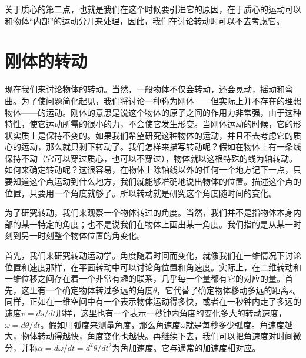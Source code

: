 关于质心的第二点，也就是我们在这个时候要引进它的原因，在于质心的运动可以和物体“内部”的运动分开来处理，因此，我们在讨论转动时可以不去考虑它。

\section{刚体的转动}

现在我们来讨论物体的转动。当然，一般物体不仅会转动，还会晃动，摇动和弯曲。为了使问题简化起见，我们将讨论一种称为刚体——但实际上并不存在的理想物体——的运动。刚体的意思是说这个物体的原子之间的作用力非常强，由于这种特性，使它运动所需的很小的力，不会使它发生形变。当刚体运动的时候，它的形状实质上是保持不变的。如果我们希望研究这种物体的运动，并且不去考虑它的质心的运动，那么就只剩下转动了。我们怎样来描写转动呢？假如在物体上有一条线保持不动（它可以穿过质心，也可以不穿过），物体就以这根特殊的线为轴转动。如何来确定转动呢？这很容易，在物体上除轴线以外的任何一个地方记下一点，只要知道这个点运动到什么地方，我们就能够准确地说出物体的位置。描述这个点的位置，只要用一个角度就够了。所以转动就是研究这个角度随时间的变化。

为了研究转动，我们来观察一个物体转过的角度。当然，我们并不是指物体本身内部的某一特定的角度；也不是说我们在物体上画出某一角度。我们指的是从某一时刻到另一时刻整个物体位置的角变化。

首先，我们来研究转动运动学。角度随着时间而变化，就像我们在一维情况下讨论位置和速度那样，在平面转动中可以讨论角位置和角速度。实际上，在二维转动和一维位移之间存在着一个非常有趣的联系，几乎每一个量都有它的对应的量。首先，这里有一个确定物体转过多远的角度$\theta$，它代替了确定物体移动多远的距离$s$。同样，正如在一维空间中有一个表示物体运动得多快，或者在一秒钟内走了多远的速度$v=ds/dt$那样，这里也有一个表示一秒钟内角度的变化多大的转动速度，$\omega=d\theta/dt$。假如用弧度来测量角度，那么角速度$\omega$就是每秒多少弧度。角速度越大，物体转动得越快，角度变化也越快。再继续下去，我们可以把角速度对时间微分，并称$\alpha=d\omega/dt=d^2\theta/dt^2$为角加速度。它与通常的加速度相对应。

